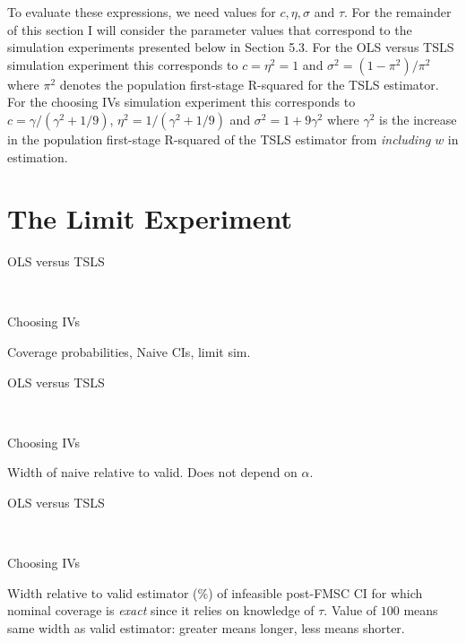 \documentclass[12pt,letterpaper]{article}
\begin{document}
To evaluate these expressions, we need values for $c, \eta, \sigma$ and $\tau$.
For the remainder of this section I will consider the parameter values that correspond to the simulation experiments presented below in Section 5.3.
For the OLS versus TSLS simulation experiment this corresponds to $c=\eta^2=1$ and $\sigma^2 = (1-\pi^2)/\pi^2$ where $\pi^2$ denotes the population first-stage R-squared for the TSLS estimator. 
For the choosing IVs simulation experiment this corresponds to $c =\gamma/(\gamma^2 +1/9)$, $\eta^2 = 1/(\gamma^2 + 1/9)$ and $\sigma^2 = 1 + 9\gamma^2$ where $\gamma^2$ is the increase in the population first-stage R-squared of the TSLS estimator from \emph{including} $w$ in estimation.

\section{The Limit Experiment}

\begin{table}[h]
  \centering
  \begin{subtable}{0.48\textwidth}
    \caption{OLS versus TSLS}
    
  \end{subtable}
  ~
  \begin{subtable}{0.48\textwidth}
    \caption{Choosing IVs}
    
  \end{subtable}
  \label{tab:LimitNaiveCover}
  \caption{Coverage probabilities, Naive CIs, limit sim.}
\end{table}

\begin{table}[h]
  \centering
  \begin{subtable}{0.48\textwidth}
    \caption{OLS versus TSLS}
    
  \end{subtable}
  ~
  \begin{subtable}{0.48\textwidth}
    \caption{Choosing IVs}
    
  \end{subtable}
  \label{tab:LimitNaiveWidth}
  \caption{Width of naive relative to valid. Does not depend on $\alpha$.}
\end{table}

\begin{table}[h]
  \centering
  \begin{subtable}{0.48\textwidth}
    \caption{OLS versus TSLS}
    
  \end{subtable}
  ~
  \begin{subtable}{0.48\textwidth}
    \caption{Choosing IVs}
    
  \end{subtable}
  \label{tab:WidthInfeasible}
  \caption{Width relative to valid estimator (\%) of infeasible post-FMSC CI for which nominal coverage is \emph{exact} since it relies on knowledge of $\tau$. Value of $100$ means same width as valid estimator: greater means longer, less means shorter.}
\end{table}
\end{document}
